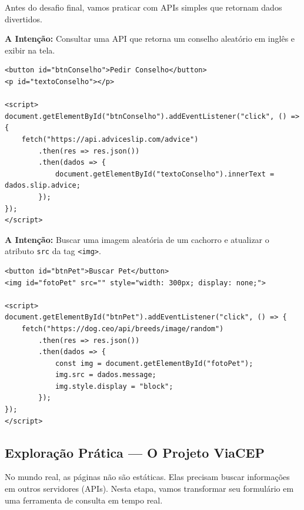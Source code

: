 \documentclass[12pt,a4paper]{article}
\begin{document}
Antes do desafio final, vamos praticar com APIs simples que retornam dados divertidos.

\begin{boxAtividade}
\textbf{A Intenção:} Consultar uma API que retorna um conselho aleatório em inglês e exibir na tela.

\begin{boxCodigo}
\begin{verbatim}
<button id="btnConselho">Pedir Conselho</button>
<p id="textoConselho"></p>

<script>
document.getElementById("btnConselho").addEventListener("click", () => {
    fetch("https://api.adviceslip.com/advice")
        .then(res => res.json())
        .then(dados => {
            document.getElementById("textoConselho").innerText = dados.slip.advice;
        });
});
</script>
\end{verbatim}
\end{boxCodigo}
\end{boxAtividade}

\begin{boxAtividade}
\textbf{A Intenção:} Buscar uma imagem aleatória de um cachorro e atualizar o atributo \texttt{src} da tag \texttt{<img>}.

\begin{boxCodigo}
\begin{verbatim}
<button id="btnPet">Buscar Pet</button>
<img id="fotoPet" src="" style="width: 300px; display: none;">

<script>
document.getElementById("btnPet").addEventListener("click", () => {
    fetch("https://dog.ceo/api/breeds/image/random")
        .then(res => res.json())
        .then(dados => {
            const img = document.getElementById("fotoPet");
            img.src = dados.message;
            img.style.display = "block";
        });
});
</script>
\end{verbatim}
\end{boxCodigo}
\end{boxAtividade}

\subsection{Exploração Prática — O Projeto ViaCEP}

No mundo real, as páginas não são estáticas. Elas precisam buscar informações em outros servidores (APIs). Nesta etapa, vamos transformar seu formulário em uma ferramenta de consulta em tempo real.
\end{document}
